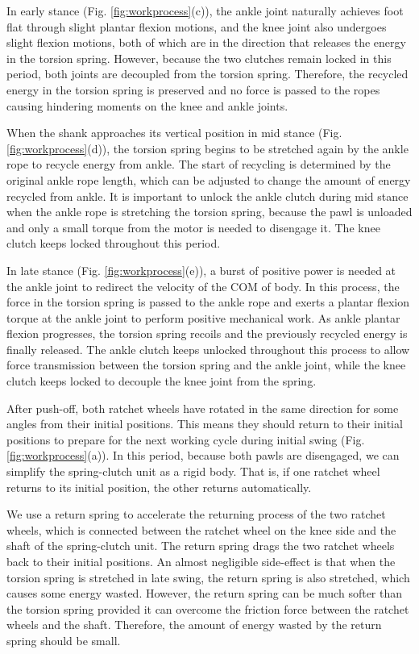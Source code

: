\documentclass[10pt]{asme2ej}
\begin{document}
In early stance (Fig. \ref{fig:workprocess}(c)), the ankle joint naturally achieves foot flat through slight plantar flexion motions, and the knee joint also undergoes slight flexion motions, both of which are in the direction that releases the energy in the torsion spring.
However, because the two clutches remain locked in this period, both joints are decoupled from the torsion spring.
Therefore, the recycled energy in the torsion spring is preserved and no force is passed to the ropes causing hindering moments on the knee and ankle joints.

When the shank approaches its vertical position in mid stance (Fig. \ref{fig:workprocess}(d)), the torsion spring begins to be stretched again by the ankle rope to recycle energy from ankle.
The start of recycling is determined by the original ankle rope length, which can be adjusted to change the amount of energy recycled from ankle.
It is important to unlock the ankle clutch during mid stance when the ankle rope is stretching the torsion spring, because the pawl is unloaded and only a small torque from the motor is needed to disengage it.
The knee clutch keeps locked throughout this period.

In late stance (Fig. \ref{fig:workprocess}(e)), a burst of positive power is needed at the ankle joint to redirect the velocity of the COM of body.
In this process, the force in the torsion spring is passed to the ankle rope and exerts a plantar flexion torque at the ankle joint to perform positive mechanical work.
As ankle plantar flexion progresses, the torsion spring recoils and the previously recycled energy is finally released.
The ankle clutch keeps unlocked throughout this process to allow force transmission between the torsion spring and the ankle joint, while the knee clutch keeps locked to decouple the knee joint from the spring.

After push-off, both ratchet wheels have rotated in the same direction for some angles from their initial positions.
This means they should return to their initial positions to prepare for the next working cycle during initial swing (Fig. \ref{fig:workprocess}(a)).
In this period, because both pawls are disengaged, we can simplify the spring-clutch unit as a rigid body.
That is, if one ratchet wheel returns to its initial position, the other returns automatically.

We use a return spring to accelerate the returning process of the two ratchet wheels, which is connected between the ratchet wheel on the knee side and the shaft of the spring-clutch unit.
The return spring drags the two ratchet wheels back to their initial positions.
An almost negligible side-effect is that when the torsion spring is stretched in late swing, the return spring is also stretched, which causes some energy wasted.
However, the return spring can be much softer than the torsion spring provided it can overcome the friction force between the ratchet wheels and the shaft.
Therefore, the amount of energy wasted by the return spring should be small. 
\end{document}
